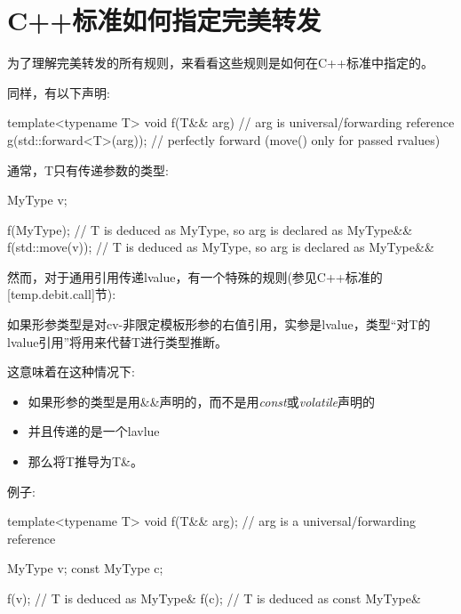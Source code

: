 \section{C++标准如何指定完美转发}

为了理解完美转发的所有规则，来看看这些规则是如何在C++标准中指定的。\par

同样，有以下声明:\par

\begin{codebox}[cpp]
template<typename T>
void f(T&& arg) // arg is universal/forwarding reference
{
  g(std::forward<T>(arg)); // perfectly forward (move() only for passed rvalues)
}
\end{codebox}

通常，T只有传递参数的类型:\par

\begin{codebox}[cpp]
MyType v;

f(MyType{}); // T is deduced as MyType, so arg is declared as MyType&&
f(std::move(v)); // T is deduced as MyType, so arg is declared as MyType&&
\end{codebox}

然而，对于通用引用传递lvalue，有一个特殊的规则(参见C++标准的[temp.debit.call]节):\par

如果形参类型是对cv-非限定模板形参的右值引用，实参是lvalue，类型“对T的lvalue引用”将用来代替T进行类型推断。\par

\par

这意味着在这种情况下:\par

\begin{itemize}
  \item 如果形参的类型是用\&\&声明的，而不是用\textit{const}或\textit{volatile}声明的
  \item 并且传递的是一个lavlue
  \item 那么将T推导为T\&。
\end{itemize}

例子:\par

\begin{codebox}[cpp]
template<typename T>
void f(T&& arg); // arg is a universal/forwarding reference

MyType v;
const MyType c;

f(v); // T is deduced as MyType&
f(c); // T is deduced as const MyType&
\end{codebox}

